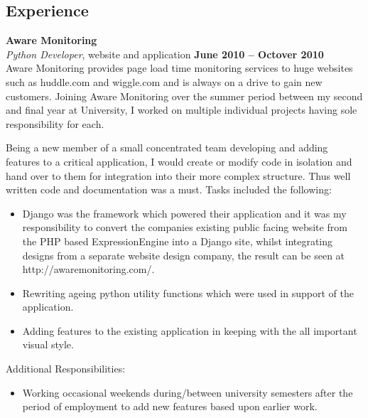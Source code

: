 \documentclass[margin,line]{resume}
\begin{document}
\begin{resume}
    \section{\mysidestyle Experience}

    \textbf{Aware Monitoring} \vspace{2mm}\\\vspace{1mm}%
    \textsl{Python Developer}, website and application \hfill \textbf{June 2010 -- Octover 2010}\\
    Aware Monitoring provides page load time monitoring services to huge websites such as huddle.com and wiggle.com and is always on a drive to gain new customers.
	Joining Aware Monitoring over the summer period between my second and final year at University, I worked on multiple individual projects having sole responsibility for each.

	Being a new member of a small concentrated team developing and adding features to a critical application, I would create or modify code in isolation and hand over to them for integration into their more complex structure. Thus well written code and documentation was a must.
	Tasks included the following:
	\begin{itemize}
		\item Django was the framework which powered their application and it was my responsibility to convert the companies existing public facing website from the PHP based ExpressionEngine into a Django site, whilst integrating designs from a separate website design company, the result can be seen at http://awaremonitoring.com/.
		\item Rewriting ageing python utility functions which were used in support of the application.
		\item Adding features to the existing application in keeping with the all important visual style.
	\end{itemize}
	
	Additional Responsibilities: 
	\begin{itemize}
		\item Working occasional weekends during/between university semesters after the period of employment to add new features based upon earlier work.
	\end{itemize}
	

\end{resume}
\end{document}
